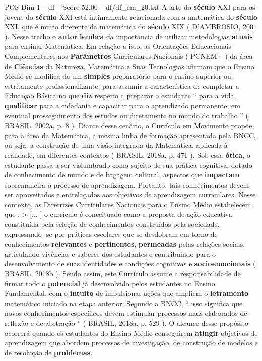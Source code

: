 \begin{textsample}{POS Dim 1 – df – Score 52.00 – df/df\_em\_20.txt}
A arte do \textbf{século} XXI para os jovens do \textbf{século} XXI está intimamente relacionada com a matemática do \textbf{século} XXI, que é muito diferente da matemática do \textbf{século} XIX ( D’AMBROSIO, 2001 ).
Nesse trecho o \textbf{autor} \textbf{lembra} da importância de utilizar metodologias \textbf{atuais} para ensinar Matemática.
Em relação a isso, as Orientações Educacionais Complementares aos \textbf{Parâmetros} Curriculares Nacionais ( PCNEM+ ) da área de \textbf{Ciências} da Natureza, Matemática e Suas Tecnologias afirmam que o Ensino Médio se modifica de um \textbf{simples} preparatório para o ensino superior ou estritamente profissionalizante, para assumir a característica de completar a Educação Básica no que \textbf{diz} respeito a preparar o estudante “ para a vida, \textbf{qualificar} para a cidadania e capacitar para o aprendizado permanente, em eventual prosseguimento dos estudos ou diretamente no mundo do trabalho ” ( BRASIL, 2002a, p. 8 ).
Diante desse cenário, o Currículo em Movimento propõe, para a área da Matemática, a mesma linha de formação apresentada pela BNCC, ou seja, a construção de uma visão integrada da Matemática, aplicada à realidade, em diferentes contextos ( BRASIL, 2018a, p. 471 ).
Sob essa \textbf{ótica}, o estudante passa a ser vislumbrado como sujeito de sua prática cognitiva, dotado de conhecimento de mundo e de bagagem cultural, aspectos que \textbf{impactam} sobremaneira o processo de aprendizagem.
Portanto, tais conhecimentos devem ser aproveitados e entrelaçados aos objetivos de aprendizagem curriculares.
Nesse contexto, as Diretrizes Curriculares Nacionais para o Ensino Médio estabelecem que : > [... ] o currículo é conceituado como a proposta de ação educativa constituída pela seleção de conhecimentos construídos pela sociedade, expressando -se por práticas escolares que se desdobram em torno de conhecimentos \textbf{relevantes} e \textbf{pertinentes}, \textbf{permeadas} pelas relações sociais, articulando vivências e saberes dos estudantes e contribuindo para o desenvolvimento de suas identidades e condições cognitivas e \textbf{socioemocionais} ( BRASIL, 2018b ).
Sendo assim, este Currículo assume a responsabilidade de firmar todo o \textbf{potencial} já desenvolvido pelos estudantes no Ensino Fundamental, com o \textbf{intuito} de impulsionar ações que ampliem o \textbf{letramento} matemático iniciado na etapa anterior.
Segundo a BNCC, “ isso significa que novos conhecimentos específicos devem estimular processos mais elaborados de reflexão e de abstração ” ( BRASIL, 2018a, p. 529 ).
O alcance desse propósito ocorrerá quando os estudantes do Ensino Médio conseguirem \textbf{atingir} objetivos de aprendizagem que abordem processos de investigação, de construção de modelos e de resolução de \textbf{problemas}.

\end{textsample}
